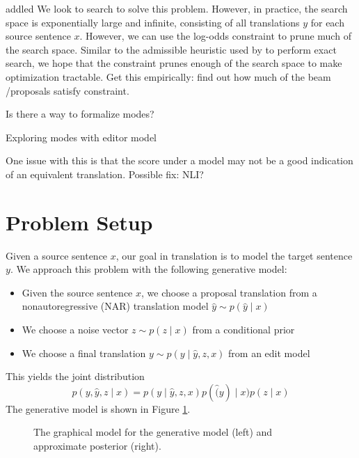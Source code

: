 \documentclass[11pt]{article}
\begin{document}
{\color{red}addled}
We look to search to solve this problem.
However, in practice, the search space is exponentially large and infinite, consisting
of all translations $y$ for each source sentence $x$.
However, we can use the log-odds constraint to prune much of the search space.
Similar to the admissible heuristic used by \citet{catgotyourtongue} to perform
exact search, we hope that the constraint prunes enough of the search space to make optimization
tractable.
{\color{red}Get this empirically: find out how much of the beam /proposals satisfy constraint}.

{\color{red}Is there a way to formalize modes?}

{\color{red}Exploring modes with editor model}

One issue with this is that the score under a model may not be a good indication of an
equivalent translation. Possible fix: NLI?


\section{Problem Setup}
Given a source sentence $x$, our goal in translation is to model the target sentence $y$.
We approach this problem with the following generative model:
\begin{itemize}
\item Given the source sentence $x$, we choose a proposal translation
    from a nonautoregressive (NAR) translation model  $\hat{y}\sim p(\hat{y} \mid x)$
\item We choose a noise vector $z \sim p(z \mid x)$ from a conditional prior
\item We choose a final translation $y \sim p(y \mid \hat{y}, z, x)$ from an edit model
\end{itemize}
This yields the joint distribution
$$p(y,\hat{y},z \mid x) = p(y \mid \hat{y}, z, x)p(\hat(y) \mid x)p(z \mid x)$$
The generative model is shown in Figure \ref{fig:gen-model}.

\begin{figure}
\centering
\begin{subfigure}{0.48\textwidth}
\centering
{}
\end{subfigure}
\hfill
\begin{subfigure}{0.48\textwidth}
\centering
{}
\end{subfigure}

\caption{
\label{fig:gen-model}
The graphical model for the generative model (left)
and approximate posterior (right).
}
\end{figure}
\end{document}
